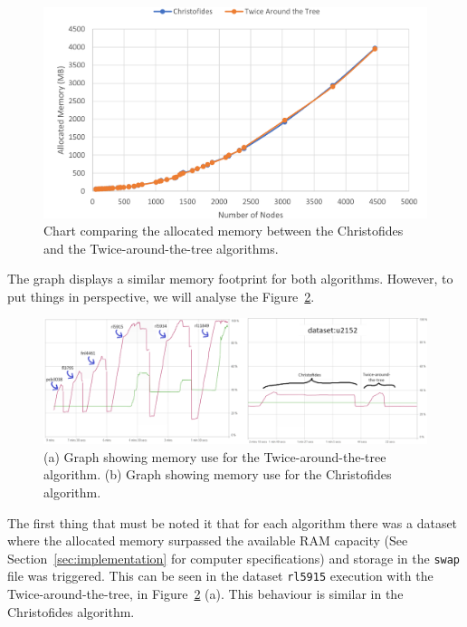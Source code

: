 \documentclass[12pt]{article}
\begin{document}
\begin{figure}[ht]
\centering
\includegraphics[height=.325\textheight]{memory_use_comparison.png}
\caption{Chart comparing the allocated memory between the Christofides and the Twice-around-the-tree algorithms.}
\label{fig:mem_use}
\end{figure}

The graph displays a similar memory footprint for both algorithms. However, to put things in perspective, 
we will analyse the Figure~\ref{fig:memory_behaviour}.

\begin{figure}[ht]
\centering
\includegraphics[width=\textwidth]{memory_profile_comparison.png}
\caption{(a) Graph showing memory use for the Twice-around-the-tree algorithm. (b) Graph showing memory use for the Christofides algorithm.}
\label{fig:memory_behaviour}
\end{figure}

The first thing that must be noted it that for each algorithm there was a dataset where the allocated memory surpassed 
the available RAM capacity (See Section~\ref{sec:implementation} for computer specifications) and storage in the \texttt{swap}
\footnotemark file was triggered. This can be seen in the dataset \texttt{rl5915} execution with the Twice-around-the-tree, 
in Figure~\ref{fig:memory_behaviour} (a). This behaviour is similar in the Christofides algorithm.
\end{document}
